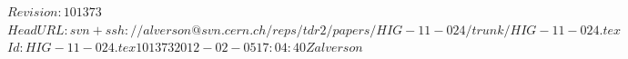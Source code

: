 \documentclass[11pt,twoside,a4paper,cmspaper,final,collab]{cms-tdr}
\begin{document}



\RCS$Revision: 101373 $
\RCS$HeadURL: svn+ssh://alverson@svn.cern.ch/reps/tdr2/papers/HIG-11-024/trunk/HIG-11-024.tex $
\RCS$Id: HIG-11-024.tex 101373 2012-02-05 17:04:40Z alverson $
\newlength\cmsFigWidth\setlength{}



\newcommand{\Hi}{\PH}
\newcommand{\W}{\PW}
\newcommand{\Wjets}{\ensuremath{\PW+\mathrm{jets}}}
\newcommand{\Zjets}{\ensuremath{\cPZ+\mathrm{jets}}}
\newcommand{\WW}{\PWp{}\PWm}
\newcommand{\ZZ}{\ensuremath{\cPZ\cPZ}}
\newcommand{\WZ}{\ensuremath{\PW\cPZ}}
\newcommand{\El}{\Pe}
\newcommand{\Elp}{\Pep}
\newcommand{\Elm}{\Pem}
\newcommand{\Elpm}{\ensuremath{\Pe^{\pm}}}
\newcommand{\Elmp}{\ensuremath{\Pe^{\mp}}}
\newcommand{\M}{\Pgm}
\newcommand{\Mp}{\Pgmp}
\newcommand{\Mm}{\Pgmm}
\newcommand{\Mmp}{\ensuremath{\Pgm^{\mp}}}
\newcommand{\Tau}{\Pgt}
\newcommand{\Nu}{\cPgn}
\newcommand{\Nubar}{\cPagn}
\newcommand{\Lep}{\ensuremath{\mathrm{\ell}}}
\newcommand{\Lepp}{\ensuremath{\mathrm{\ell}^{+}}}
\newcommand{\Lepm}{\ensuremath{\mathrm{\ell}^{-}}}
\newcommand{\Lprime}{\ensuremath{\Lep^{\prime}}}
\newcommand{\PP}{\Pp{}\Pp}
\newcommand{\PPbar}{\Pp{}\Pap}
\newcommand{\qq}{\Pq{}\Pq}
\newcommand{\To}{\ensuremath{\rightarrow}}

\newcommand{\mHi}{\ensuremath{m_{\PH}}}
\newcommand{\mW}{\ensuremath{m_{\PW}}}
\newcommand{\mZ}{\ensuremath{m_{\cPZ}}}
\newcommand{\mll}{\ensuremath{m_{\Lep\Lep}}}

\newcommand{\ptveto}{\ensuremath{\pt^\text{veto}}}
\newcommand{\ptl}{\ensuremath{p_\perp^{\Lep}}}
\newcommand{\ptlmax}{\ensuremath{\pt^{\Lep,\mathrm{max}}}}
\newcommand{\ptlmin}{\ensuremath{\pt^{\Lep,\mathrm{min}}}}
\newcommand{\met}{\MET}
\newcommand{\delphill}{\ensuremath{\Delta\phi_{\Lep\Lep}}}
\newcommand{\deletall}{\ensuremath{\Delta\eta_{\Lep\Lep}}}
\newcommand{\delphimetl}{\ensuremath{\Delta\phi_{\met\Lep}}}
\newcommand{\delphimetll}{\ensuremath{\Delta\phi_{\met\Lep\Lep}}}
\newcommand{\Et}{\ET}
\newcommand{\delR}{\ensuremath{\Delta R}}
\newcommand{\Eta}{\ensuremath{\eta}}
\newcommand{\GAMMA}{\Pgg}

\newcommand{\effsig}{\ensuremath{\varepsilon_{\text{bkg}}^{\mathrm{S}}}}
\newcommand{\effnorm}{\ensuremath{\varepsilon_{\text{bkg}}^{\mathrm{N}}}}
\newcommand{\Nsig}{\ensuremath{N_{\text{bkg}}^{\mathrm{S}}}}
\newcommand{\Nnorm}{\ensuremath{N_{\text{bkg}}^{\mathrm{N}}}}
\end{document}
